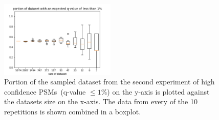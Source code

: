 \begin{figure}
	\normalsize
	\centering
	\includegraphics[width = 0.49\textwidth]{figures/expected.png}
	\caption[Portion of the dataset with high-confidence PSMs]{Portion of the sampled dataset from the second experiment of high confidence PSMs~(q-value $\leq1\%$) on the y-axis is plotted against the datasets size on the x-axis. The data from every of the 10 repetitions is shown combined in a boxplot.}
	\label{fig:results:small_dataset_snd_expected}
\end{figure}
